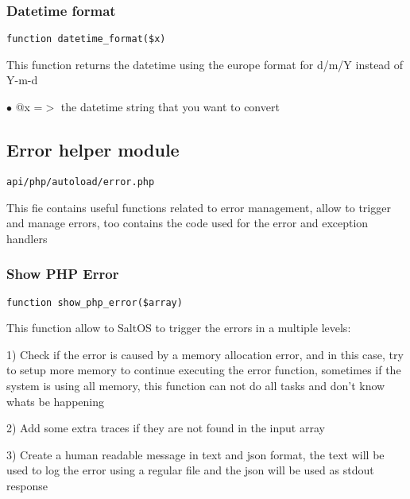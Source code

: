 \documentclass[a4paper]{article}
\begin{document}
\hypertarget{toc109}{}
\subsubsection{Datetime format}

\begin{lstlisting}
function datetime_format($x)
\end{lstlisting}

This function returns the datetime using the europe format for d/m/Y instead of Y-m-d

\begin{compactitem}
\item[\color{myblue}$\bullet$] @x =$>$ the datetime string that you want to convert
\end{compactitem}

\hypertarget{toc110}{}
\subsection{Error helper module}

\begin{lstlisting}
api/php/autoload/error.php
\end{lstlisting}

This fie contains useful functions related to error management, allow to trigger and manage
errors, too contains the code used for the error and exception handlers

\hypertarget{toc111}{}
\subsubsection{Show PHP Error}

\begin{lstlisting}
function show_php_error($array)
\end{lstlisting}

This function allow to SaltOS to trigger the errors in a multiple levels:

1) Check if the error is caused by a memory allocation error, and in this case, try
to setup more memory to continue executing the error function, sometimes if the system
is using all memory, this function can not do all tasks and don't know whats be happening

2) Add some extra traces if they are not found in the input array

3) Create a human readable message in text and json format, the text will be used
to log the error using a regular file and the json will be used as stdout response
\end{document}
